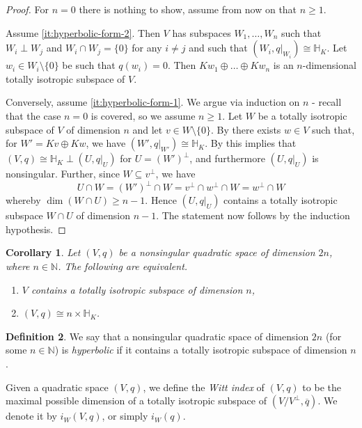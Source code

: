 \documentclass[12pt, leqno, british]{amsart}
\theoremstyle{definition}
\newtheorem{defi}{Definition}[subsection]
\theoremstyle{plain}
\newtheorem{cor}[defi]{Corollary}
\theoremstyle{remark}
\newcommand{\mbb}{\mathbb}
\newcommand{\nat}{\mbb N}
\newcommand{\ovl}{\overline}
\begin{document}
\begin{proof}
For $n = 0$ there is nothing to show, assume from now on that $n \geq 1$.

Assume \eqref{it:hyperbolic-form-2}. 
Then $V$ has subspaces $W_1, \ldots, W_n$ such that $W_i \perp W_j$ and $W_i \cap W_j = \lbrace 0 \rbrace$ for any $i \neq j$ and such that $(W_i, q\vert_{W_i}) \cong \mbb{H}_K$.
Let $w_i \in W_i \setminus \lbrace 0 \rbrace$ be such that $q(w_i) = 0$.
Then $Kw_1 \oplus \ldots \oplus Kw_n$ is an $n$-dimensional totally isotropic subspace of $V$.

Conversely, assume \eqref{it:hyperbolic-form-1}.
We argue via induction on $n$ - recall that the case $n = 0$ is covered, so we assume $n \geq 1$.
Let $W$ be a totally isotropic subspace of $V$ of dimension $n$ and let $v \in W \setminus \lbrace 0 \rbrace$.
By  there exists $w \in V$ such that, for $W' = Kv \oplus Kw$, we have $(W', q\vert_{W'}) \cong \mbb{H}_K$.
By  this implies that $(V, q) \cong \mbb{H}_K \perp (U, q\vert_U)$ for $U=(W')^\perp$, and furthermore $(U, q\vert_U)$ is nonsingular.
Further, since $W \subseteq v^\perp$, we have
$$ U \cap W = (W')^\perp \cap W = v^\perp \cap w^\perp \cap W = w^\perp \cap W $$
whereby $\dim(W \cap U) \geq n-1$.
Hence $(U, q\vert_U)$ contains a totally isotropic subspace $W \cap U$ of dimension $n-1$.
The statement now follows by the induction hypothesis.
\end{proof}
\begin{cor}\label{C:hyperbolic-form}
Let $(V, q)$ be a nonsingular quadratic space of dimension $2n$, where $n \in \nat$.
The following are equivalent.
\begin{enumerate}
\item $V$ contains a totally isotropic subspace of dimension $n$,
\item $(V, q) \cong n \times \mbb{H}_K$.
\end{enumerate}
\end{cor}
\begin{defi}
We say that a nonsingular quadratic space of dimension $2n$ (for some $n \in \nat$) is \emph{hyperbolic} if it contains a totally isotropic subspace of dimension $n$.

Given a quadratic space $(V, q)$, we define the \emph{Witt index} of $(V, q)$ to be the maximal possible dimension of a totally isotropic subspace of $(V/V^\perp, \ovl{q})$.
We denote it by $i_W(V, q)$, or simply $i_W(q)$.
\end{defi}
\end{document}
